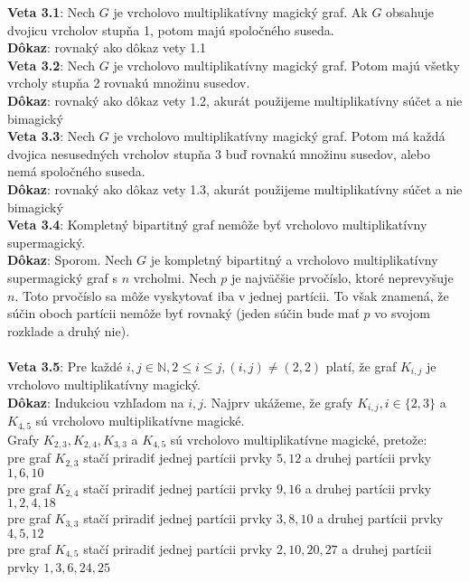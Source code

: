 \documentclass[12pt]{article}
\begin{document}
\textbf{Veta 3.1}: Nech $G$ je vrcholovo multiplikatívny magický graf. Ak $G$ obsahuje dvojicu vrcholov stupňa 1, potom majú spoločného suseda. \\

\textbf{Dôkaz}: rovnaký ako dôkaz vety 1.1 \\

\textbf{Veta 3.2}: Nech $G$ je vrcholovo multiplikatívny magický graf. Potom majú všetky vrcholy stupňa 2 rovnakú množinu susedov. \\

\textbf{Dôkaz}: rovnaký ako dôkaz vety 1.2, akurát použijeme multiplikatívny súčet a nie bimagický \\

\textbf{Veta 3.3}: Nech $G$ je vrcholovo multiplikatívny magický graf. Potom má každá dvojica nesusedných vrcholov stupňa 3 buď rovnakú množinu susedov, alebo nemá spoločného suseda.  \\

\textbf{Dôkaz}: rovnaký ako dôkaz vety 1.3, akurát použijeme multiplikatívny súčet a nie bimagický \\

\textbf{Veta 3.4}: Kompletný bipartitný graf nemôže byť vrcholovo multiplikatívny supermagický. \\

\textbf{Dôkaz}: Sporom. Nech $G$ je kompletný bipartitný a vrcholovo multiplikatívny supermagický graf s $n$ vrcholmi. Nech $p$ je najväčšie prvočíslo, ktoré neprevyšuje $n$. Toto prvočíslo sa môže vyskytovať iba v jednej partícii. To však znamená, že súčin oboch partícii nemôže byť rovnaký (jeden súčin bude mať $p$ vo svojom rozklade a druhý nie). \\\\

\textbf{Veta 3.5}: Pre každé $i,j \in \mathbb{N}, 2 \leq i \leq j, (i, j) \neq (2, 2)$ platí, že graf $K_{i,j}$ je vrcholovo multiplikatívny magický. \\

\textbf{Dôkaz}: Indukciou vzhľadom na $i,j$. Najprv ukážeme, že grafy $K_{i,j}, i \in \{2,3\}$ a $K_{4,5}$ sú vrcholovo multiplikatívne magické. \\

Grafy $K_{2,3}, K_{2,4}, K_{3,3}$ a $K_{4,5}$ sú vrcholovo multiplikatívne magické, pretože: \\
pre graf $K_{2,3}$ stačí priradiť jednej partícii prvky $5, 12$ a druhej partícii prvky $1, 6, 10$ \\
pre graf $K_{2,4}$ stačí priradiť jednej partícii prvky $9, 16$ a druhej partícii prvky $1, 2, 4, 18$ \\
pre graf $K_{3,3}$ stačí priradiť jednej partícii prvky $3, 8, 10$ a druhej partícii prvky $4, 5, 12$ \\
pre graf $K_{4,5}$ stačí priradiť jednej partícii prvky $2, 10, 20, 27$ a druhej partícii prvky $1, 3, 6, 24, 25$ \\
\end{document}
